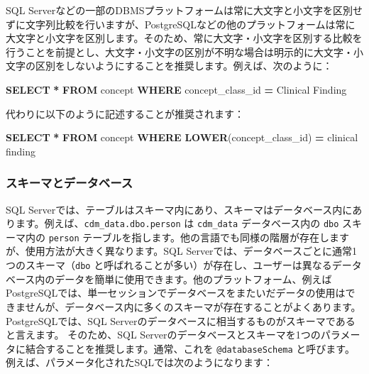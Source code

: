 \documentclass[
  11pt]{book}
\newenvironment{Shaded}{\begin{snugshade}}{\end{snugshade}}
\newcommand{\FunctionTok}[1]{\textcolor[rgb]{0.13,0.29,0.53}{\textbf{#1}}}
\newcommand{\KeywordTok}[1]{\textcolor[rgb]{0.13,0.29,0.53}{\textbf{#1}}}
\newcommand{\NormalTok}[1]{#1}
\newcommand{\OperatorTok}[1]{\textcolor[rgb]{0.81,0.36,0.00}{\textbf{#1}}}
\newcommand{\StringTok}[1]{\textcolor[rgb]{0.31,0.60,0.02}{#1}}
\theoremstyle{definition}
\theoremstyle{definition}
\theoremstyle{definition}
\theoremstyle{definition}
\theoremstyle{remark}
\begin{document}
SQL Serverなどの一部のDBMSプラットフォームは常に大文字と小文字を区別せずに文字列比較を行いますが、PostgreSQLなどの他のプラットフォームは常に大文字と小文字を区別します。そのため、常に大文字・小文字を区別する比較を行うことを前提とし、大文字・小文字の区別が不明な場合は明示的に大文字・小文字の区別をしないようにすることを推奨します。例えば、次のように：

\begin{Shaded}
\begin{Highlighting}[]
\KeywordTok{SELECT} \OperatorTok{*} \KeywordTok{FROM}\NormalTok{ concept }\KeywordTok{WHERE}\NormalTok{ concept\_class\_id }\OperatorTok{=} \StringTok{\textquotesingle{}Clinical Finding\textquotesingle{}}
\end{Highlighting}
\end{Shaded}

代わりに以下のように記述することが推奨されます：

\begin{Shaded}
\begin{Highlighting}[]
\KeywordTok{SELECT} \OperatorTok{*} \KeywordTok{FROM}\NormalTok{ concept }\KeywordTok{WHERE} \FunctionTok{LOWER}\NormalTok{(concept\_class\_id) }\OperatorTok{=} \StringTok{\textquotesingle{}clinical finding\textquotesingle{}}
\end{Highlighting}
\end{Shaded}

\subsubsection*{スキーマとデータベース}\label{ux30b9ux30adux30fcux30deux3068ux30c7ux30fcux30bfux30d9ux30fcux30b9}

SQL Serverでは、テーブルはスキーマ内にあり、スキーマはデータベース内にあります。例えば、\texttt{cdm\_data.dbo.person} は \texttt{cdm\_data} データベース内の \texttt{dbo} スキーマ内の \texttt{person} テーブルを指します。他の言語でも同様の階層が存在しますが、使用方法が大きく異なります。SQL Serverでは、データベースごとに通常1つのスキーマ（\texttt{dbo} と呼ばれることが多い）が存在し、ユーザーは異なるデータベース内のデータを簡単に使用できます。他のプラットフォーム、例えばPostgreSQLでは、単一セッションでデータベースをまたいだデータの使用はできませんが、データベース内に多くのスキーマが存在することがよくあります。PostgreSQLでは、SQL Serverのデータベースに相当するものがスキーマであると言えます。 そのため、SQL Serverのデータベースとスキーマを1つのパラメータに結合することを推奨します。通常、これを \texttt{@databaseSchema} と呼びます。例えば、パラメータ化されたSQLでは次のようになります：
\end{document}
